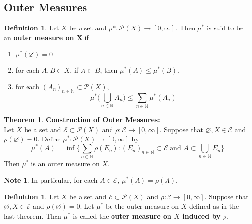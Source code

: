 \documentclass[12pt]{amsart}
\theoremstyle{definition}
\newtheorem{defn}[definition]{Definition}
\newtheorem{note}[definition]{Note}
\newtheorem{thm}[definition]{Theorem}
\newcommand{\N}{\mathbb{N}}
\newcommand{\MP}{\mathcal{P}}
\newcommand{\ME}{\mathcal{E}}
\begin{document}
	
	
	
	
	
	
	
	
	
	
	
	
	
	
	
	
	
	\subsection{Outer Measures}
	
	\begin{defn}
		Let $X$ be a set and $\mu* : \MP(X) \rightarrow [0, \infty]$. Then $\mu^*$ is said to be an \textbf{outer measure on X} if 
		\begin{enumerate}
			\item $\mu^*(\varnothing) = 0$
			\item for each $A,B \subset X $, if $A \subset B$, then $\mu^*(A) \leq \mu^*(B)$.
			\item for each $(A_n)_{n \in \N} \subset \MP(X)$, $$\mu^*\big(\bigcup\limits_{n \in \N} A_n\big) \leq \sum\limits_{n \in \N}\mu^*(A_n) $$
		\end{enumerate}
	\end{defn}
	
	\begin{thm}\textbf{Construction of Outer Measures:} \\
		Let $X$ be a set and $\ME \subset \MP(X)$ and $\rho: \ME \rightarrow [0, \infty]$. Suppose that $\varnothing, X \in \ME$ and $\rho(\varnothing) = 0$. Define $\mu^*:\MP(X) \rightarrow [0, \infty]$ by $$\mu^*(A) = \inf \bigg \{\sum_{n \in \N}\rho(E_n): (E_n)_{n \in \N} \subset \ME \text{ and }A \subset \bigcup_{n \in \N}E_n \bigg \}$$ Then $\mu^*$ is an outer measure on $X$.
	\end{thm}
	
	\begin{note}
		In particular, for each $A \in \ME$, $\mu^*(A) = \rho(A)$.
	\end{note}
	
	\begin{defn}
		Let $X$ be a set and $\ME \subset \MP(X)$ and $\rho: \ME \rightarrow [0, \infty]$. Suppose that $\varnothing, X \in \ME$ and $\rho(\varnothing) = 0$. Let $\mu^*$ be the outer measure on $X$ defined as in the last theorem. Then $\mu^*$ is called the \textbf{outer measure on $X$ induced by $\rho$}.
	\end{defn}
	
\end{document}
